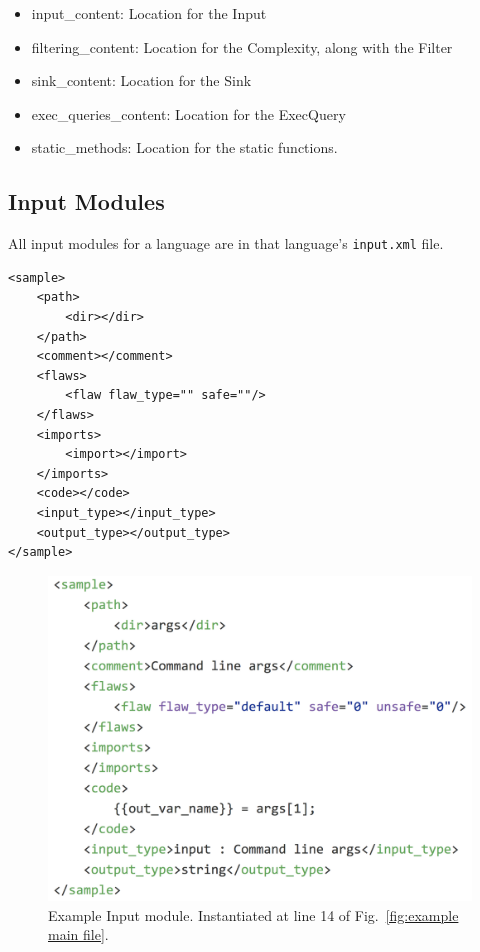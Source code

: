\documentclass[12pt]{article}
\begin{document}
\begin{itemize}
\begin{itemize}
        \item input\_content:  Location for the Input

        \item filtering\_content:  Location for the Complexity, along 
        with the Filter

        \item sink\_content:  Location for the Sink

        \item exec\_queries\_content:  Location for the ExecQuery

        \item static\_methods:  Location for the static functions.
    \end{itemize}
\end{itemize}


\subsection{Input Modules}
\label{sec: input module}

All input modules for a language are in that language's \verb|input.xml|
file.

\begin{verbatim}
<sample>
    <path>
        <dir></dir>
    </path>
    <comment></comment>
    <flaws>
        <flaw flaw_type="" safe=""/>
    </flaws>
    <imports>
        <import></import>
    </imports>
    <code></code>
    <input_type></input_type>
    <output_type></output_type>
</sample>
\end{verbatim}

\begin{figure}[htb]
  \includegraphics{fig_Input_file.png}
  \caption{Example Input module.  Instantiated at line 14 of 
  Fig.~\ref{fig:example main file}.}
  \label{fig:example input file}
\end{figure}
\end{document}
